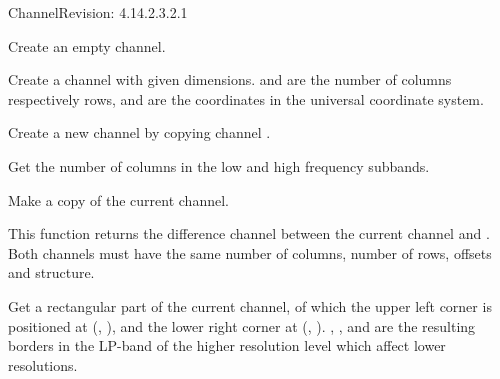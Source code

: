 \begin{manpage}{\libtitle}{Channel}{$ $Revision: 4.14.2.3.2.1 $ $}

\subtitle{Declaration}

    Create an empty channel.

    Create a channel with given dimensions.  and  are the
    number of columns respectively rows,  and  are the
    coordinates in the universal coordinate system.

    Create a new channel by copying channel .


\subtitle{Public \\ Operations}

    Get the number of columns in the low and high frequency subbands.


\subtitle{Virtual \\ Operations}

    Make a copy of the current channel.

    This function returns the difference channel between the current channel
    and . Both channels must have the same number of columns,
    number of rows, offsets and structure.

    Get a rectangular part of the current channel, of which the upper left
    corner is positioned at (, ), and the lower right corner
    at (, ). , ,  and
     are the resulting borders in the LP-band of the higher
    resolution level which affect lower resolutions.


\separator


\end{manpage}
